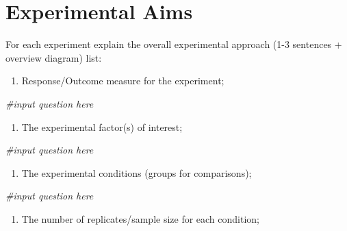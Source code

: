 \documentclass[
]{book}
\newenvironment{Shaded}{\begin{snugshade}}{\end{snugshade}}
\newcommand{\CommentTok}[1]{\textcolor[rgb]{0.56,0.35,0.01}{\textit{#1}}}
\providecommand{\tightlist}{%
  \setlength{\itemsep}{0pt}\setlength{\parskip}{0pt}}
\begin{document}
\hypertarget{experimental-aims}{%
\section{Experimental Aims}\label{experimental-aims}}

For each experiment explain the overall experimental approach (1-3 sentences + overview diagram) list:

\begin{enumerate}
\def\labelenumi{\arabic{enumi})}
\tightlist
\item
  Response/Outcome measure for the experiment;
\end{enumerate}

\begin{Shaded}
\begin{Highlighting}[]
\CommentTok{\#input question here}
\end{Highlighting}
\end{Shaded}

\begin{enumerate}
\def\labelenumi{\arabic{enumi})}
\setcounter{enumi}{1}
\tightlist
\item
  The experimental factor(s) of interest;
\end{enumerate}

\begin{Shaded}
\begin{Highlighting}[]
\CommentTok{\#input question here}
\end{Highlighting}
\end{Shaded}

\begin{enumerate}
\def\labelenumi{\arabic{enumi})}
\setcounter{enumi}{2}
\tightlist
\item
  The experimental conditions (groups for comparisons);
\end{enumerate}

\begin{Shaded}
\begin{Highlighting}[]
\CommentTok{\#input question here}
\end{Highlighting}
\end{Shaded}

\begin{enumerate}
\def\labelenumi{\arabic{enumi})}
\setcounter{enumi}{3}
\tightlist
\item
  The number of replicates/sample size for each condition;
\end{enumerate}
\end{document}
